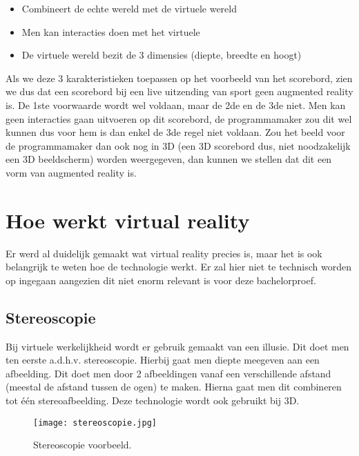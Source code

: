 \begin{itemize}
	\item Combineert de echte wereld met de virtuele wereld
	\item Men kan interacties doen met het virtuele
	\item De virtuele wereld bezit de 3 dimensies (diepte, breedte en hoogt)
\end{itemize}

Als we deze 3 karakteristieken toepassen op het voorbeeld van het scorebord, zien we dus dat een scorebord bij een live uitzending van sport geen augmented reality is. De 1ste voorwaarde wordt wel voldaan, maar de 2de en de 3de niet. Men kan geen interacties gaan uitvoeren op dit scorebord, de programmamaker zou dit wel kunnen dus voor hem is dan enkel de 3de regel niet voldaan. Zou het beeld voor de programmamaker dan ook nog in 3D (een 3D scorebord dus, niet noodzakelijk een 3D beeldscherm) worden weergegeven, dan kunnen we stellen dat dit een vorm van augmented reality is.


\section{Hoe werkt virtual reality}
\label{sec:hoe-werkt-vr}
Er werd al duidelijk gemaakt wat virtual reality precies is, maar het is ook belangrijk te weten hoe de technologie werkt. Er zal hier niet te technisch worden op ingegaan aangezien dit niet enorm relevant is voor deze bachelorproef.

\subsection{Stereoscopie}
\label{subsec:stereoscopie}
Bij virtuele werkelijkheid wordt er gebruik gemaakt van een illusie. Dit doet men ten eerste a.d.h.v. stereoscopie. Hierbij gaat men diepte meegeven aan een afbeelding. Dit doet men door 2 afbeeldingen vanaf een verschillende afstand (meestal de afstand tussen de ogen) te maken. Hierna gaat men dit combineren tot één stereoafbeelding. Deze technologie wordt ook gebruikt bij 3D. 

\begin{figure}
	\centering
	\texttt{[image: stereoscopie.jpg]}
	\caption{Stereoscopie voorbeeld.}
	\label{fig:stereoscopie}
\end{figure}

